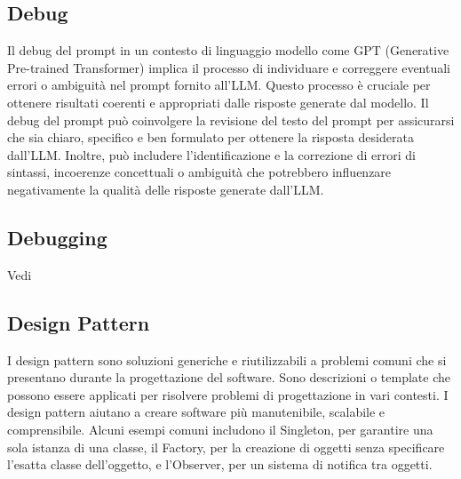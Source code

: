 \subsection*{Debug}
Il debug del prompt in un contesto di linguaggio modello come GPT (Generative Pre-trained Transformer) implica il processo di individuare e correggere eventuali errori o ambiguità nel prompt fornito all'LLM. Questo processo è cruciale per ottenere risultati coerenti e appropriati dalle risposte generate dal modello. Il debug del prompt può coinvolgere la revisione del testo del prompt per assicurarsi che sia chiaro, specifico e ben formulato per ottenere la risposta desiderata dall'LLM. Inoltre, può includere l'identificazione e la correzione di errori di sintassi, incoerenze concettuali o ambiguità che potrebbero influenzare negativamente la qualità delle risposte generate dall'LLM.


\vspace{2em}
\subsection*{Debugging}
\par Vedi 

\vspace{2em}
\subsection*{Design Pattern}
I design pattern sono soluzioni generiche e riutilizzabili a problemi comuni che si presentano durante la progettazione del software. Sono descrizioni o template che possono essere applicati per risolvere problemi di progettazione in vari contesti. I design pattern aiutano a creare software più manutenibile, scalabile e comprensibile. Alcuni esempi comuni includono il Singleton, per garantire una sola istanza di una classe, il Factory, per la creazione di oggetti senza specificare l'esatta classe dell'oggetto, e l'Observer, per un sistema di notifica tra oggetti.

